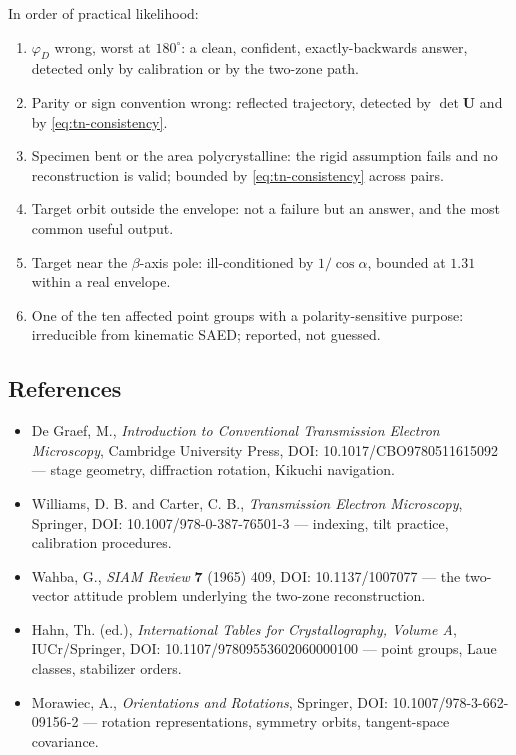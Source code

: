In order of practical likelihood:

\begin{enumerate}
  \item $\varphi_D$ wrong, worst at $180^{\circ}$: a clean, confident, exactly-backwards answer,
    detected only by calibration or by the two-zone path.
  \item Parity or sign convention wrong: reflected trajectory, detected by $\det\mathbf{U}$ and by
    \eqref{eq:tn-consistency}.
  \item Specimen bent or the area polycrystalline: the rigid assumption fails and no reconstruction
    is valid; bounded by \eqref{eq:tn-consistency} across pairs.
  \item Target orbit outside the envelope: not a failure but an answer, and the most common useful
    output.
  \item Target near the $\beta$-axis pole: ill-conditioned by $1/\cos\alpha$, bounded at $1.31$
    within a real envelope.
  \item One of the ten affected point groups with a polarity-sensitive purpose: irreducible from
    kinematic SAED; reported, not guessed.
\end{enumerate}

\subsection{References}

\begin{itemize}
  \item De Graef, M., \emph{Introduction to Conventional Transmission Electron Microscopy},
    Cambridge University Press, DOI: 10.1017/CBO9780511615092 --- stage geometry, diffraction
    rotation, Kikuchi navigation.
  \item Williams, D. B. and Carter, C. B., \emph{Transmission Electron Microscopy}, Springer,
    DOI: 10.1007/978-0-387-76501-3 --- indexing, tilt practice, calibration procedures.
  \item Wahba, G., \emph{SIAM Review} \textbf{7} (1965) 409, DOI: 10.1137/1007077 --- the
    two-vector attitude problem underlying the two-zone reconstruction.
  \item Hahn, Th. (ed.), \emph{International Tables for Crystallography, Volume A}, IUCr/Springer,
    DOI: 10.1107/97809553602060000100 --- point groups, Laue classes, stabilizer orders.
  \item Morawiec, A., \emph{Orientations and Rotations}, Springer, DOI: 10.1007/978-3-662-09156-2
    --- rotation representations, symmetry orbits, tangent-space covariance.
\end{itemize}
